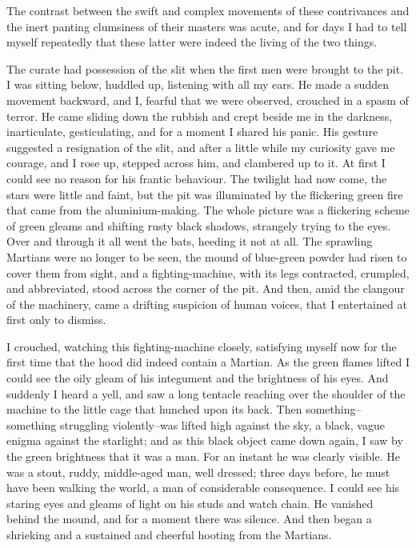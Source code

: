 The contrast between the swift and complex movements of these
contrivances and the inert panting clumsiness of their masters was
acute, and for days I had to tell myself repeatedly that these
latter were indeed the living of the two things.

The curate had possession of the slit when the first men were
brought to the pit. I was sitting below, huddled up, listening with
all my ears. He made a sudden movement backward, and I, fearful
that we were observed, crouched in a spasm of terror. He came
sliding down the rubbish and crept beside me in the darkness,
inarticulate, gesticulating, and for a moment I shared his panic.
His gesture suggested a resignation of the slit, and after a little
while my curiosity gave me courage, and I rose up, stepped across
him, and clambered up to it. At first I could see no reason for his
frantic behaviour. The twilight had now come, the stars were little
and faint, but the pit was illuminated by the flickering green fire
that came from the aluminium-making. The whole picture was a
flickering scheme of green gleams and shifting rusty black shadows,
strangely trying to the eyes. Over and through it all went the
bats, heeding it not at all. The sprawling Martians were no longer
to be seen, the mound of blue-green powder had risen to cover them
from sight, and a fighting-machine, with its legs contracted,
crumpled, and abbreviated, stood across the corner of the pit. And
then, amid the clangour of the machinery, came a drifting suspicion
of human voices, that I entertained at first only to dismiss.

I crouched, watching this fighting-machine closely, satisfying
myself now for the first time that the hood did indeed contain a
Martian. As the green flames lifted I could see the oily gleam of
his integument and the brightness of his eyes. And suddenly I heard
a yell, and saw a long tentacle reaching over the shoulder of the
machine to the little cage that hunched upon its back. Then
something--something struggling violently--was lifted high against
the sky, a black, vague enigma against the starlight; and as this
black object came down again, I saw by the green brightness that it
was a man. For an instant he was clearly visible. He was a stout,
ruddy, middle-aged man, well dressed; three days before, he must
have been walking the world, a man of considerable consequence. I
could see his staring eyes and gleams of light on his studs and
watch chain. He vanished behind the mound, and for a moment there
was silence. And then began a shrieking and a sustained and
cheerful hooting from the Martians.

